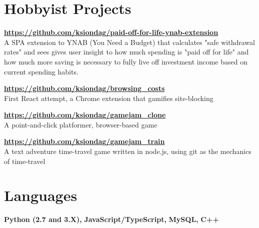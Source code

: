 \documentclass{res}
\begin{document}
\begin{resume}
\vspace{0.1in}
    
 
\section{Hobbyist Projects}
  {\bf \url{https://github.com/ksiondag/paid-off-for-life-ynab-extension}}\\
  A SPA extension to YNAB (You Need a Budget) that calculates "safe withdrawal rates" and sees gives user insight to how
  much spending is "paid off for life" and how much more saving is necessary to fully live off investment income based on
  current spending habits.

  \vspace{-5pt}
  {\bf \url{https://github.com/ksiondag/browsing_costs}}\\
  First React attempt, a Chrome extension that gamifies site-blocking

  \vspace{-5pt}
  {\bf \url{https://github.com/ksiondag/gamejam_clone}}\\
  A point-and-click platformer, browser-based game

  \vspace{-5pt}
  {\bf \url{https://github.com/ksiondag/gamejam_train}}\\
  A text adventure time-travel game written in node.js, using git as the mechanics of time-travel
\vspace{0.1in}

  
\section{Languages} 
\vspace{0.1in}
  {\bf Python (2.7 and 3.X),}
  {\bf JavaScript/TypeScript,}
  {\bf MySQL,}
  {\bf C++}
 
\end{resume}
\end{document}
